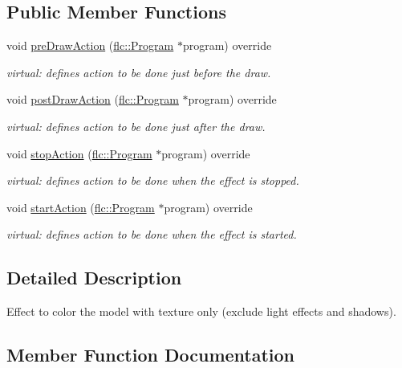 \subsection*{Public Member Functions}
\begin{DoxyCompactItemize}
\item 
void \hyperlink{classflw_1_1flf_1_1TextureOnly_a58511d525bcd55ff7cf636a08be9afc1}{pre\+Draw\+Action} (\hyperlink{classflw_1_1flc_1_1Program}{flc\+::\+Program} $\ast$program) override
\begin{DoxyCompactList}\small\item\em virtual\+: defines action to be done just before the draw. \end{DoxyCompactList}\item 
void \hyperlink{classflw_1_1flf_1_1TextureOnly_a23865e0a5b720fa183cfaf102e6471ea}{post\+Draw\+Action} (\hyperlink{classflw_1_1flc_1_1Program}{flc\+::\+Program} $\ast$program) override
\begin{DoxyCompactList}\small\item\em virtual\+: defines action to be done just after the draw. \end{DoxyCompactList}\item 
void \hyperlink{classflw_1_1flf_1_1TextureOnly_ae23d8e028389fd4894135247574f976b}{stop\+Action} (\hyperlink{classflw_1_1flc_1_1Program}{flc\+::\+Program} $\ast$program) override
\begin{DoxyCompactList}\small\item\em virtual\+: defines action to be done when the effect is stopped. \end{DoxyCompactList}\item 
void \hyperlink{classflw_1_1flf_1_1TextureOnly_a5a04ae9211a3fb98df63166d3e009a5a}{start\+Action} (\hyperlink{classflw_1_1flc_1_1Program}{flc\+::\+Program} $\ast$program) override
\begin{DoxyCompactList}\small\item\em virtual\+: defines action to be done when the effect is started. \end{DoxyCompactList}\end{DoxyCompactItemize}


\subsection{Detailed Description}
Effect to color the model with texture only (exclude light effects and shadows). 

\subsection{Member Function Documentation}

